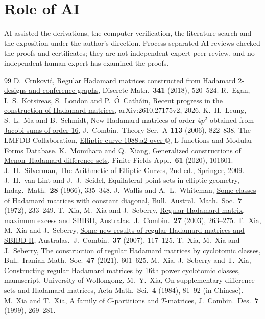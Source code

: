 \documentclass[11pt]{article}
\theoremstyle{remark}
\begin{document}
\section*{Role of AI}
AI assisted the derivations, the computer verification, the literature search and the exposition under the author's direction. Process-separated AI reviews checked the proofs and certificates; they are not independent expert peer review, and no independent human expert has examined the proofs.

\begin{thebibliography}{99}
 D.~Crnkovi\'c, \href{https://doi.org/10.1016/j.disc.2017.09.020}{Regular Hadamard matrices constructed from Hadamard 2-designs and conference graphs}, Discrete Math.\ \textbf{341} (2018), 520--524.
 R.~Egan, I.~S.~Kotsireas, S.~London and P.~\'O~Cath\'ain, \href{https://arxiv.org/abs/2610.27175}{Recent progress in the construction of Hadamard matrices}, arXiv:2610.27175v2, 2026.
 K.~H.~Leung, S.~L.~Ma and B.~Schmidt, \href{https://doi.org/10.1016/j.jcta.2005.07.011}{New Hadamard matrices of order $4p^2$ obtained from Jacobi sums of order 16}, J.\ Combin.\ Theory Ser.~A \textbf{113} (2006), 822--838.
 The LMFDB Collaboration, \href{https://www.lmfdb.org/EllipticCurve/Q/1088/a/2}{Elliptic curve 1088.a2 over $\mathbb Q$}, L-functions and Modular Forms Database.
 K.~Momihara and Q.~Xiang, \href{https://doi.org/10.1016/j.ffa.2019.101601}{Generalized constructions of Menon--Hadamard difference sets}, Finite Fields Appl.\ \textbf{61} (2020), 101601.
 J.~H.~Silverman, \href{https://doi.org/10.1007/978-0-387-09494-6}{The Arithmetic of Elliptic Curves}, 2nd ed., Springer, 2009.
 J.~H.~van Lint and J.~J.~Seidel, Equilateral point sets in elliptic geometry, Indag.\ Math.\ \textbf{28} (1966), 335--348.
 J.~Wallis and A.~L.~Whiteman, \href{https://doi.org/10.1017/S0004972700044993}{Some classes of Hadamard matrices with constant diagonal}, Bull.\ Austral.\ Math.\ Soc.\ \textbf{7} (1972), 233--249.
 T.~Xia, M.~Xia and J.~Seberry, \href{https://ajc.maths.uq.edu.au/pdf/27/ajc_v27_p263.pdf}{Regular Hadamard matrix, maximum excess and SBIBD}, Australas.\ J.\ Combin.\ \textbf{27} (2003), 263--275.
 T.~Xia, M.~Xia and J.~Seberry, \href{https://ajc.maths.uq.edu.au/pdf/37/ajc_v37_p117.pdf}{Some new results of regular Hadamard matrices and SBIBD II}, Australas.\ J.\ Combin.\ \textbf{37} (2007), 117--125.
 T.~Xia, M.~Xia and J.~Seberry, \href{https://doi.org/10.1007/s41980-020-00402-9}{The construction of regular Hadamard matrices by cyclotomic classes}, Bull.\ Iranian Math.\ Soc.\ \textbf{47} (2021), 601--625.
 M.~Xia, J.~Seberry and T.~Xia, \href{https://documents.uow.edu.au/~jennie/WEB/WEB06/Xtb27_RegularHM_Cyclotomic.pdf}{Constructing regular Hadamard matrices by 16th power cyclotomic classes}, manuscript, University of Wollongong.
 M.~Y.~Xia, On supplementary difference sets and Hadamard matrices, Acta Math.\ Sci.\ \textbf{4} (1984), 81--92 (in Chinese).
 M.~Xia and T.~Xia, A family of $C$-partitions and $T$-matrices, J.\ Combin.\ Des.\ \textbf{7} (1999), 269--281.
\end{thebibliography}
\end{document}

